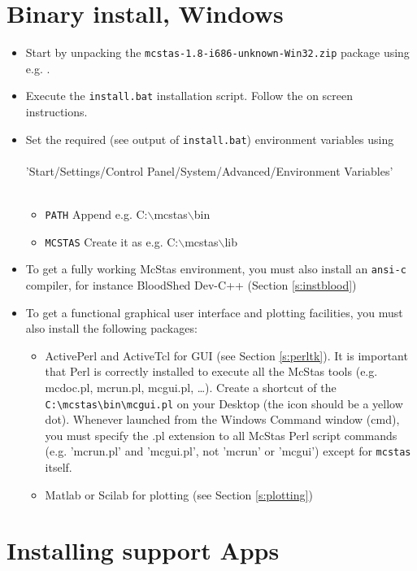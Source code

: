\section{Binary install, Windows}
\label{s:winbin}
\begin{itemize}
\item{Start by unpacking the \texttt{mcstas-1.8-i686-unknown-Win32.zip} package using
e.g. .}
\item{Execute the \texttt{install.bat} installation script. Follow the
  on screen instructions.}
\item{Set the required (see output of \texttt{install.bat}) environment variables using
\\\ \\
\noindent 'Start/Settings/Control Panel/System/Advanced/Environment
Variables'\\\ 
  \begin{itemize}
    \item{\verb+PATH+ Append e.g. C:$\backslash$mcstas$\backslash$bin}
    \item{\verb+MCSTAS+ Create it as e.g. C:$\backslash$mcstas$\backslash$lib}
  \end{itemize}}
\item{To get a fully working McStas environment, you must also install
    an \texttt{ansi-c} compiler, for instance BloodShed Dev-C++
    (Section \ref{s:instblood})}
\item{To get a functional graphical user
    interface and plotting facilities, you must also install the following
    packages:}
  \begin{itemize}
    \item{ActivePerl and ActiveTcl for GUI (see Section \ref{s:perltk}). It is important that Perl is correctly installed to execute all the McStas tools (e.g. mcdoc.pl, mcrun.pl, mcgui.pl, \ldots). Create a shortcut of the \verb+C:\mcstas\bin\mcgui.pl+ on your Desktop (the icon should be a yellow dot). Whenever launched from the Windows Command window (cmd), you must specify the .pl extension to all McStas Perl script commands (e.g. 'mcrun.pl' and 'mcgui.pl', not 'mcrun' or 'mcgui') except for \verb+mcstas+ itself.}
    \item{Matlab or Scilab for plotting (see Section \ref{s:plotting})}
  \end{itemize}
\end{itemize}

\section{Installing support Apps}
